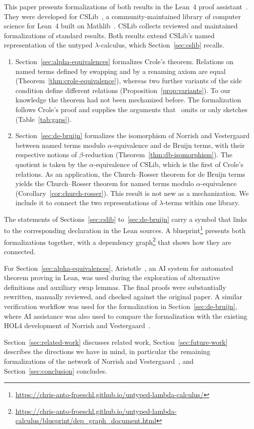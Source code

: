 This paper presents formalizations of both results in the Lean~4
proof assistant~\cite{demoura2021a}. They were developed for CSLib~\cite{demoura2026a}, a
community-maintained library of computer science for Lean~4 built on
Mathlib~\cite{mathlib2020a}. CSLib collects reviewed and maintained formalizations of
standard results. Both
results extend CSLib's named representation of the untyped
$\lambda$-calculus, which Section~\ref{sec:cslib} recalls.

\begin{enumerate}
  \item Section~\ref{sec:alpha-equivalences} formalizes Crole's
    theorem. Relations on named terms defined by swapping and by a
    renaming axiom are equal
    (Theorem~\ref{thm:crole-equivalence}), whereas two further
    variants of the side condition define different relations
    (Proposition~\ref{prop:variants}). To our knowledge the theorem
    had not been mechanized before. The formalization follows Crole's
    proof and supplies the arguments that~\cite{crole2012a} omits or
    only sketches (Table~\ref{tab:gaps}).
  \item Section~\ref{sec:de-bruijn} formalizes the isomorphism of
    Norrish and Vestergaard between named terms modulo
    $\alpha$-equivalence and de Bruijn terms, with their respective notions of
    $\beta$-reduction (Theorem~\ref{thm:db-isomorphism}). The quotient
    is taken by the $\alpha$-equivalence of CSLib, which is the first of
    Crole's relations. As an application, the Church--Rosser
    theorem for de Bruijn terms yields the Church--Rosser theorem for
    named terms modulo $\alpha$-equivalence
    (Corollary~\ref{cor:church-rosser}). This result is not new as a
    mechanization. We include it to connect the two
    representations of $\lambda$-terms within one library.
\end{enumerate}

The statements of Sections~\ref{sec:cslib}
to~\ref{sec:de-bruijn} carry a \raisebox{0.9ex}{\leanicon} symbol that links to the
corresponding declaration in the Lean sources. A
blueprint\footnote{\url{https://chris-anto-froeschl.github.io/untyped-lambda-calculus/}}
presents both formalizations together, with a dependency
graph\footnote{\url{https://chris-anto-froeschl.github.io/untyped-lambda-calculus/blueprint/dep_graph_document.html}}
that shows how they are connected.

For Section~\ref{sec:alpha-equivalences}, Aristotle~\cite{achim2025a},
an AI system for automated theorem proving in Lean, was used during
the exploration of alternative definitions and auxiliary swap lemmas.
The final proofs were substantially rewritten, manually reviewed, and
checked against the original paper. A similar verification workflow was used for the
formalization in Section~\ref{sec:de-bruijn}, where
AI assistance was also used to compare the formalization with the
existing HOL4 development of Norrish and Vestergaard~\cite{norrish2007a}.

Section~\ref{sec:related-work} discusses related work,
Section~\ref{sec:future-work} describes the directions we have in
mind, in particular the remaining formalizations of the network of
Norrish and Vestergaard~\cite[Figure~1]{norrish2007a}, and
Section~\ref{sec:conclusion} concludes.
